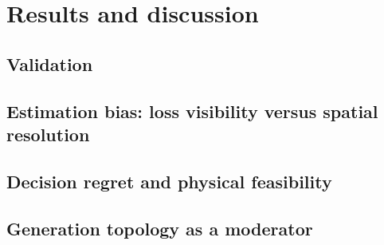 \documentclass[a4paper,fleqn]{cas-dc}
\begin{document}
\section{Results and discussion}
\label{sec:results}

\subsection{Validation}



\subsection{Estimation bias: loss visibility versus spatial resolution}


\subsection{Decision regret and physical feasibility}


\subsection{Generation topology as a moderator}
\end{document}
